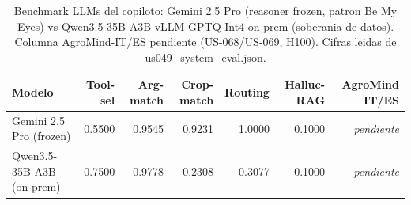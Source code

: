 \begin{table}
\caption{Benchmark LLMs del copiloto: Gemini 2.5 Pro (reasoner frozen, patron Be My Eyes) vs Qwen3.5-35B-A3B vLLM GPTQ-Int4 on-prem (soberania de datos). Columna AgroMind-IT/ES pendiente (US-068/US-069, H100). Cifras leidas de us049\_system\_eval.json.}
\label{tab:llm_benchmark}
\begin{tabular}{lrrrrrr}
\toprule
Modelo & Tool-sel & Arg-match & Crop-match & Routing & Halluc-RAG & AgroMind IT/ES \\
\midrule
Gemini 2.5 Pro (frozen) & 0.5500 & 0.9545 & 0.9231 & 1.0000 & 0.1000 & \textit{pendiente} \\
Qwen3.5-35B-A3B (on-prem) & 0.7500 & 0.9778 & 0.2308 & 0.3077 & 0.1000 & \textit{pendiente} \\
\bottomrule
\end{tabular}
\end{table}
